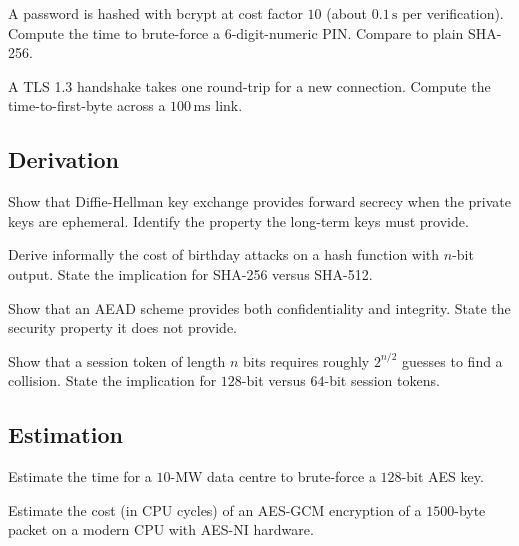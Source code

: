 \begin{exercise}
A password is hashed with bcrypt at cost factor $10$ (about $0.1\,\si{\second}$ per verification). Compute the time to brute-force a 6-digit-numeric PIN. Compare to plain SHA-256.
\end{exercise}

\begin{exercise}
A TLS 1.3 handshake takes one round-trip for a new connection. Compute the time-to-first-byte across a $100\,\si{\milli\second}$ link.
\end{exercise}

\subsection*{Derivation}

\begin{exercise}
Show that Diffie-Hellman key exchange provides forward secrecy when the private keys are ephemeral. Identify the property the long-term keys must provide.
\end{exercise}

\begin{exercise}
Derive informally the cost of birthday attacks on a hash function with $n$-bit output. State the implication for SHA-256 versus SHA-512.
\end{exercise}

\begin{exercise}
Show that an AEAD scheme provides both confidentiality and integrity. State the security property it does not provide.
\end{exercise}

\begin{exercise}
Show that a session token of length $n$ bits requires roughly $2^{n/2}$ guesses to find a collision. State the implication for $128$-bit versus $64$-bit session tokens.
\end{exercise}

\subsection*{Estimation}

\begin{exercise}
Estimate the time for a $10$-MW data centre to brute-force a $128$-bit AES key.
\end{exercise}

\begin{exercise}
Estimate the cost (in CPU cycles) of an AES-GCM encryption of a $1500$-byte packet on a modern CPU with AES-NI hardware.
\end{exercise}

